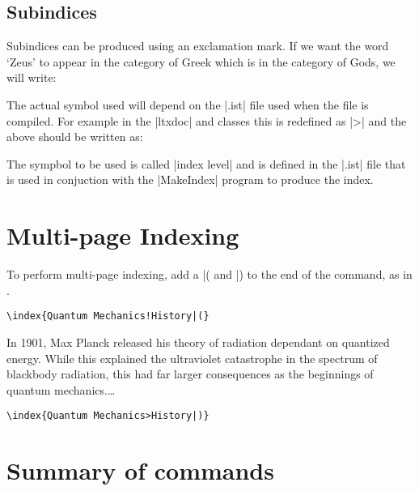 \begin{multicols}{2}
\subsection{Subindices}
Subindices can be produced using an exclamation mark. If we want the word `Zeus'
to appear in the category of Greek which is in the category of Gods, we will write:

\begin{sverbatim}
\end{sverbatim}

The actual symbol used will depend on the |.ist| file used when the file is compiled. For example in the |ltxdoc| and  classes this is redefined as |>| and the above should be written as:

\begin{sverbatim}
\end{sverbatim}

The sympbol to be used is called |index level| and is defined in the |.ist| file that is used in conjuction with the |MakeIndex| program to produce the index.

\section{Multi-page Indexing}

To perform multi-page indexing, add a |( and |) to the end of the \cmd{\index} command, as in 
.

{\small
\verb+\index{Quantum Mechanics!History|(}+

\narrower\narrower
In 1901, Max Planck released his theory of radiation dependant 
on quantized energy. While this explained the ultraviolet catastrophe
 in the spectrum of blackbody radiation, this had far larger consequences 
as the beginnings of quantum mechanics.\ldots

\verb+\index{Quantum Mechanics>History|)}+
}

\end{multicols}



\section{Summary of commands}

